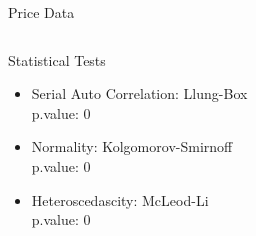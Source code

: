 \documentclass[final, xcolor=table]{beamer}\usepackage[]{graphicx}\usepackage[]{color}
\begin{document}
\begin{columns}[t]
\begin{column}{.32 \linewidth}
\begin{block}{Price Data}
 
 
  \end{block}
  
\end{column}

\end{columns}


\begin{columns}[t]


\begin{column}{.32 \linewidth}

  \begin{block}{Statistical Tests}

    \begin{itemize}
    
      \item Serial Auto Correlation: Llung-Box \\
            p.value: 0 \\
      
      \item Normality: Kolgomorov-Smirnoff \\
            p.value: 0 \\
            
      \item Heteroscedascity:  McLeod-Li\\
            p.value: 0 \\
    
    \end{itemize}
  

  \end{block}
  
\end{column}


\begin{column}{.32 \linewidth}


\end{column}
\end{columns}
\end{document}
